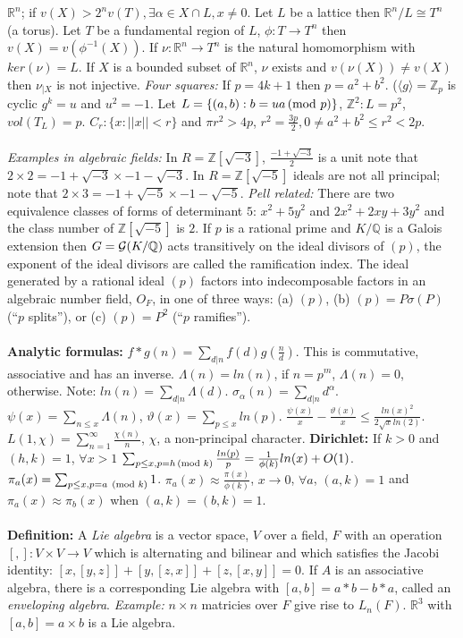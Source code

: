 ${\mathbb R}^n$; if $v(X)> 2^n v(T), \exists \alpha \in X \cap L, x \ne 0$.  Let
$L$ be a lattice then ${\mathbb R}^n/L \cong T^n$ (a torus).  Let
$T$ be a fundamental region of $L$, $\phi: T \rightarrow T^n$ then
$v(X) = v(\phi^{-1}(X))$.  If $\nu: {\mathbb R}^n \rightarrow T^n$ is the
natural homomorphism with $ker(\nu)=L$.  If $X$ is a bounded subset of
${\mathbb R}^n$, $\nu$ exists and $v(\nu(X)) \ne v(X)$ then $\nu_{|X}$ is
not injective.  \emph{Four squares:} If $p= 4k+1$ then $p=a^2 + b^2$.  
($\langle g \rangle = {\mathbb Z}_p$
is cyclic $g^k=u$ and $u^2= -1$.  Let $L= \{(a,b): b=ua \thinspace \textnormal{(mod } p \textnormal{)} \}$,
${\mathbb Z}^2:L= p^2$, $vol(T_L)=p$.  $C_r: \{ x: ||x||<r \}$ and $\pi r^2>4p$,
$r^2= {\frac {3p} 2}, 0 \ne a^2 +b^2 \le r^2 <2p$.
\\
\\
\emph{Examples in algebraic fields:} In
$R= {\mathbb Z}[{\sqrt {-3}}]$, ${\frac {-1+{\sqrt {-3}}} 2}$ is a unit note that
$2 \times 2 = {-1+{\sqrt {-3}}} \times {-1-{\sqrt {-3}}}$.
In $R= {\mathbb Z}[{\sqrt {-5}}]$ ideals are not all principal; note that
$2 \times 3 = {-1+{\sqrt {-5}}} \times {-1-{\sqrt {-5}}}$.  \emph{Pell related:}
There are two equivalence classes of forms of determinant $5$:   $x^2+5y^2$ and
$2 x^2 + 2xy +3y^2$ and the class number of ${\mathbb Z} [{\sqrt {-5}}]$ is $2$.
If $p$ is a rational prime and $K/ {\mathbb Q}$ is a Galois extension 
then $G= {\cal G}(K/{\mathbb Q})$ acts transitively on the ideal divisors of $(p)$,
the exponent of the ideal divisors are called the ramification index.  The ideal generated
by a rational ideal $(p)$ factors into indecomposable factors
in an algebraic number field, $O_F$, in one of
three ways: (a) $(p)$, (b) $(p)= P \sigma(P)$ (``$p$ splits''), or (c)
$(p)= P^2$ (``$p$ ramifies'').
\\
\\
{\bf Analytic formulas:} $f*g(n)= \sum_{d|n} f(d)g({\frac n d})$.  
This is commutative, associative and has an inverse.
$\Lambda(n)= ln(n)$, if $n= p^m$,
$\Lambda(n)= 0$, otherwise.  Note: $ln(n)= \sum_{d|n} \Lambda(d)$.
$\sigma_{\alpha}(n)= \sum_{d|n} d^{\alpha}$.
$\psi(x)= \sum_{n \leq x} \Lambda(n)$,
$\vartheta(x)= \sum_{p \leq x} ln(p)$.
${\frac {\psi(x)} {x}} -
{\frac {\vartheta(x)} {x}} \leq {\frac {ln(x)^2} {2 {\sqrt x} ln(2)}}$.
$L(1,\chi)= \sum_{n=1}^{\infty} {\frac {\chi(n)} n}$, $\chi$, a
non-principal character.
{\bf Dirichlet:}  If $k>0$ and $(h,k)=1$, $\forall x>1$
$\sum_{p \leq x, p=h \thinspace \textnormal{(mod } k \textnormal{)}} {\frac {ln(p)} p}=
{\frac 1 {\phi(k)}} ln(x) + O(1)$.
$\pi_a (x)= \sum_{p \leq x, p=a \; \thinspace \textnormal{(mod } k \textnormal{)}} 1$.
$\pi_a (x) \approx {\frac {\pi(x)} {\phi(k)}}$, $x \rightarrow 0$,
$\forall a$, $(a, k)=1$ and $\pi_a (x) \approx \pi_b (x)$ when
$(a,k)=(b,k)=1$.
\\
\\
{\bf Definition:} A \emph{Lie algebra} is a vector space, $V$ over a field, $F$ with an operation
$[,]: V \times V \rightarrow V$ which is alternating and bilinear and which satisfies the Jacobi
identity: $[x,[y,z]] + [y,[z,x]] + [z, [x,y]]= 0$.  If $A$ is an associative algebra, there is
a corresponding Lie algebra with $[a,b]= a*b-b*a$, called an \emph{enveloping algebra}.
\emph{Example:} $n \times n$ matricies over $F$ give rise to $L_n(F)$.  ${\mathbb R}^3$ with
$[a, b]= a \times b$ is a Lie algebra.


